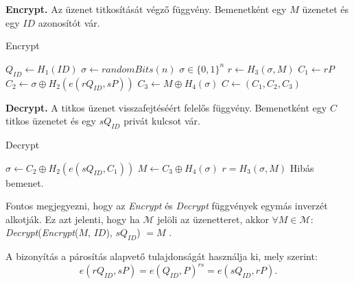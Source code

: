 \begin{outdentlist}
    \item[]\textbf{Encrypt.}
    Az üzenet titkosítását végző függvény. Bemenetként egy $M$ üzenetet és egy $ID$ azonosítót vár.
    \begin{algorithm}[H]
        \caption{Encrypt}
        \label{algorithm:encrypt}
        \begin{algorithmic}
            \State $Q_{ID} \gets H_1(ID)$
            \State $\sigma \gets randomBits(n)$ \Comment $\sigma \in \{0, 1\}^n$
            \State $r \gets H_3(\sigma, M)$
            \State $C_1 \gets rP$
            \State $C_2 \gets \sigma \oplus H_2(e(rQ_{ID}, sP))$
            \State $C_3 \gets M \oplus H_4(\sigma)$
            \State $C \gets (C_1, C_2, C_3)$
            \State {}
            \EndProcedure
        \end{algorithmic}
    \end{algorithm}

    \item[]\textbf{Decrypt.}
    A titkos üzenet visszafejtéséért felelős függvény. Bemenetként egy $C$ titkos üzenetet és egy $sQ_{ID}$ privát kulcsot vár.
    \begin{algorithm}[H]
        \caption{Decrypt}
        \label{algorithm:decrypt}
        \begin{algorithmic}
            \State $\sigma \gets C_2 \oplus H_2(e(sQ_{ID}, C_1))$
            \State $M \gets C_3 \oplus H_4(\sigma)$
            \State $r = H_3(\sigma, M)$
                \State {} \Comment Hibás bemenet.
            \EndIf
            \State {}
            \EndProcedure
        \end{algorithmic}
    \end{algorithm}
\end{outdentlist}

Fontos megjegyezni, hogy az \textit{Encrypt} és \textit{Decrypt} függvények egymás inverzét alkotják. Ez azt jelenti, hogy ha $\mathcal{M}$ jelöli az üzenetteret, akkor $\forall M \in \mathcal{M} :$ \textit{Decrypt}(\textit{Encrypt}($M$, $ID$), $sQ_{ID}$) $= M$ \cite{Boneh::IdentityBasedEncryptionFromTheWeilPairing}.

A bizonyítás a párosítás alapvető tulajdonságát használja ki, mely szerint:
$$e(rQ_{ID},sP)=e(Q_{ID},P)^{rs}=e(sQ_{ID},rP).$$
